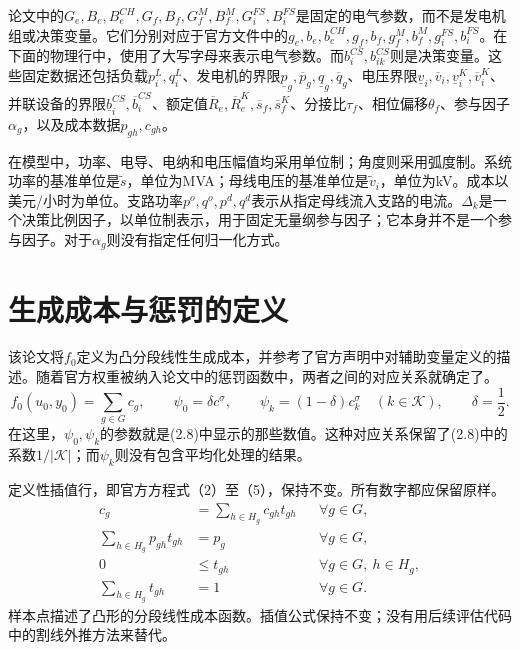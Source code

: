 \documentclass{article}
\begin{document}
论文中的$G_e,B_e,B_e^{CH},G_f,B_f,G_f^M,B_f^M,G_i^{FS},B_i^{FS}$是固定的电气参数，而不是发电机组或决策变量。它们分别对应于官方文件中的$g_e,b_e,b_e^{CH},g_f,b_f,g_f^M,b_f^M,g_i^{FS},b_i^{FS}$。在下面的物理行中，使用了大写字母来表示电气参数。而$b_i^{CS},b_{ik}^{CS}$则是决策变量。这些固定数据还包括负载$p_i^L,q_i^L$、发电机的界限$\underline p_g,\overline p_g,\underline q_g,\overline q_g$、电压界限$\underline v_i,\overline v_i,\underline v_i^K,\overline v_i^K$、并联设备的界限$\underline b_i^{CS},\overline b_i^{CS}$、额定值$\overline R_e,\overline R_e^K,\overline s_f,\overline s_f^K$、分接比$\tau_f$、相位偏移$\theta_f$、参与因子$\alpha_g$，以及成本数据$p_{gh},c_{gh}$。

在模型中，功率、电导、电纳和电压幅值均采用单位制；角度则采用弧度制。系统功率的基准单位是$\widetilde s$，单位为MVA；母线电压的基准单位是$\widetilde v_i$，单位为kV。成本以美元/小时为单位。支路功率$p^o,q^o,p^d,q^d$表示从指定母线流入支路的电流。$\Delta_k$是一个决策比例因子，以单位制表示，用于固定无量纲参与因子；它本身并不是一个参与因子。对于$\alpha_g$则没有指定任何归一化方式。

\section*{生成成本与惩罚的定义}
该论文将$f_0$定义为凸分段线性生成成本，并参考了官方声明中对辅助变量定义的描述。随着官方权重被纳入论文中的惩罚函数中，两者之间的对应关系就确定了。
\[
f_0(u_0,y_0)=\sum_{g\in G}c_g,\qquad
\psi_0=\delta c^\sigma,\qquad
\psi_k=(1-\delta)c_k^\sigma\quad(k\in\mathcal K),\qquad
\delta=\frac12.
\]
在这里，$\psi_0,\psi_k$的参数就是(2.8)中显示的那些数值。这种对应关系保留了(2.8)中的系数$1/|\mathcal K|$；而$\psi_k$则没有包含平均化处理的结果。

定义性插值行，即官方方程式（2）至（5），保持不变。所有数字都应保留原样。
\begin{align*}
c_g&=\sum_{h\in H_g}c_{gh}t_{gh} &&\forall g\in G,\\
\sum_{h\in H_g}p_{gh}t_{gh}&=p_g &&\forall g\in G,\\
0&\leq t_{gh} &&\forall g\in G,\ h\in H_g,\\
\sum_{h\in H_g}t_{gh}&=1 &&\forall g\in G.
\end{align*}
样本点描述了凸形的分段线性成本函数。插值公式保持不变；没有用后续评估代码中的割线外推方法来替代。
\end{document}
